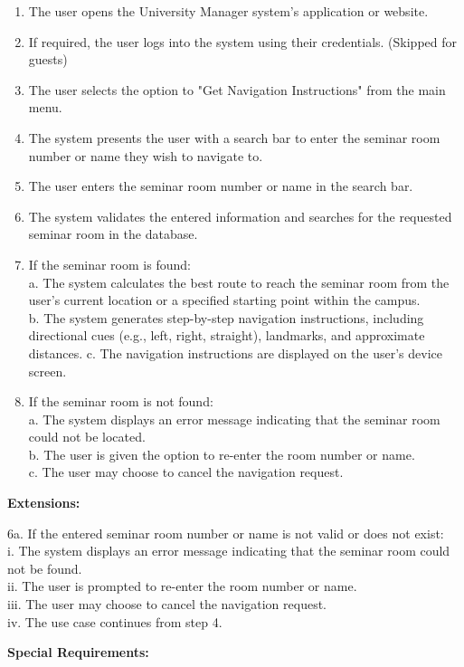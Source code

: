 \documentclass[article,onecolumn]{IEEEtran}
\begin{document}
\begin{framed}
	\begin{enumerate}
		\item The user opens the University Manager system's application or website.
		\item If required, the user logs into the system using their credentials. (Skipped for guests)
		\item The user selects the option to "Get Navigation Instructions" from the main menu.
		\item The system presents the user with a search bar to enter the seminar room number or name they wish to navigate to.
		\item The user enters the seminar room number or name in the search bar.
		\item The system validates the entered information and searches for the requested seminar room in the database.
		\item If the seminar room is found:\\
		a. The system calculates the best route to reach the seminar room from the user's current location or a specified starting point within the campus.\\
		b. The system generates step-by-step navigation instructions, including directional cues (e.g., left, right, straight), landmarks, and approximate distances.
		c. The navigation instructions are displayed on the user's device screen.
		\item If the seminar room is not found:\\
		a. The system displays an error message indicating that the seminar room could not be located.\\
		b. The user is given the option to re-enter the room number or name.\\
		c. The user may choose to cancel the navigation request.
	\end{enumerate}
	
	\textbf{Extensions:}
	
	6a. If the entered seminar room number or name is not valid or does not exist:\\
	i. The system displays an error message indicating that the seminar room could not be found.\\
	ii. The user is prompted to re-enter the room number or name.\\
	iii. The user may choose to cancel the navigation request.\\
	iv. The use case continues from step 4.
	
	\textbf{Special Requirements:}
	

\end{framed}
\end{document}

